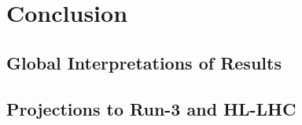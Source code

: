 \chapter{Conclusion}

\section{Global Interpretations of Results}

\section{Projections to Run-3 and HL-LHC}